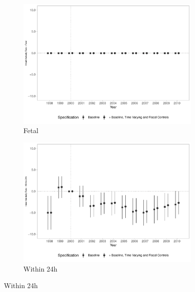 \begin{figure}[h!]
    \begin{center}
    \caption{Effects on Infant Mortality Rates - By Timing}\label{fig:16}
    \begin{subfigure}{0.48\textwidth}
        \caption{\scriptsize Fetal}\label{fig:16a}
        \centering
        \includegraphics[width=\textwidth]{plots/tx_mi_fet_dist_ec29_baseline_dist_ec29_baseline_16.pdf}
    \end{subfigure}
    \begin{subfigure}{0.48\textwidth}
        \centering
        \caption{\scriptsize Within 24h}\label{fig:16b}
        \includegraphics[width=\textwidth]{plots/tx_mi_24h_dist_ec29_baseline_dist_ec29_baseline_16.pdf}
    \end{subfigure}

\end{center}
\end{figure}
